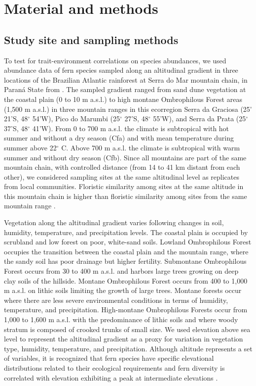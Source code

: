 \documentclass[12pt]{article}
\begin{document}
\section*{Material and methods}

\subsection*{Study site and sampling methods}
To test for trait-environment correlations on species
abundances, we used abundance data of fern species sampled along an
altitudinal gradient in three locations of the Brazilian Atlantic
rainforest at Serra do Mar mountain chain, in Paran\'a State from
\cite{Paciencia2008}.  The sampled gradient ranged from sand dune
vegetation at the coastal plain (0 to 10 m a.s.l.) to high montane
Ombrophilous Forest areas (1,500 m a.s.l.) in three mountain ranges in
this ecorregion Serra da Graciosa (25{$^{\circ}$} 21'S,
48{$^{\circ}$} 54'W), Pico do Marumbi (25{$^{\circ}$} 27'S,
48{$^{\circ}$} 55'W), and Serra da Prata (25{$^{\circ}$} 37'S,
48{$^{\circ}$} 41'W). From 0 to 700 m a.s.l. the climate is
subtropical with hot summer and without a dry season (Cfa) and with
mean temperature during summer above 22{$^{\circ}$} C. Above 700 m
a.s.l. the climate is subtropical with warm summer and without dry
season (Cfb). Since all mountains are part of the same mountain chain,
with controlled distance (from 14 to 41 km distant from each other),
we considered sampling sites at the same altitudinal level as
replicates from local communities.  Floristic similarity
among sites at the same altitude in this mountain chain is higher than
floristic similarity among sites from the same mountain range
\citep{Paciencia2008}.
 
Vegetation along the altitudinal gradient varies following changes in
soil, humidity, temperature, and precipitation levels.  The coastal
plain is occupied by scrubland and low forest on poor, white-sand
soils.  Lowland Ombrophilous Forest occupies the transition between
the coastal plain and the mountain range, where the sandy soil has
poor drainage but higher fertility.  Submontane Ombrophilous Forest
occurs from 30 to 400 m a.s.l. and harbors large trees growing on deep
clay soils of the hillside. Montane Ombrophilous Forest occurs from
400 to 1,000 m a.s.l. on lithic soils limiting the growth of large
trees. Montane forests occur where there are less severe environmental
conditions in terms of humidity, temperature, and
precipitation. High-montane Ombrophilous Forests occur from 1,000 to
1,600 m a.s.l. with the predominance of lithic soils and where woody
stratum is composed of crooked trunks of small size.  We used
elevation above sea level to represent the altitudinal gradient as a
proxy for variation in vegetation type, humidity, temperature, and
precipitation.  Although altitude represents a set of variables, it is
recognized that fern species have specific elevational distributions
related to their ecological requirements \citep{Mehltreter2010} and
fern diversity is correlated with elevation exhibiting a peak at
intermediate elevations
\citep{Kessler2001,Cardelus2006,WatkinsJr2006}.
\end{document}
